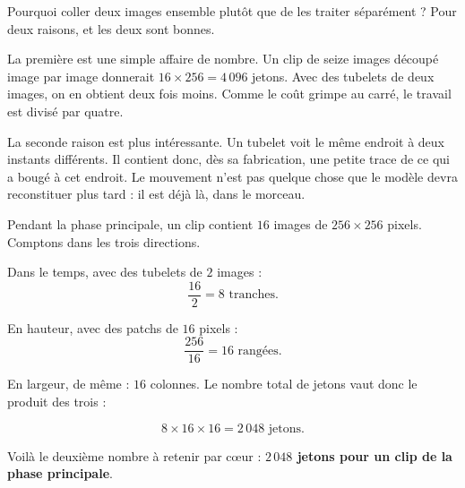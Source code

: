 Pourquoi coller deux images ensemble plutôt que de les traiter séparément ?
Pour deux raisons, et les deux sont bonnes.

La première est une simple affaire de nombre. Un clip de seize images
découpé image par image donnerait $16 \times 256 = 4\,096$ jetons. Avec des
tubelets de deux images, on en obtient deux fois moins. Comme le coût grimpe
au carré, le travail est divisé par quatre.

La seconde raison est plus intéressante. Un tubelet voit le même endroit à
deux instants différents. Il contient donc, dès sa fabrication, une petite
trace de ce qui a bougé à cet endroit. Le mouvement n'est pas quelque chose
que le modèle devra reconstituer plus tard : il est déjà là, dans le
morceau.

\begin{exemple}
Pendant la phase principale, un clip contient $16$ images de
$256 \times 256$ pixels. Comptons dans les trois directions.

Dans le temps, avec des tubelets de $2$ images :
\[ \frac{16}{2} = 8 \text{ tranches.} \]

En hauteur, avec des patchs de $16$ pixels :
\[ \frac{256}{16} = 16 \text{ rangées.} \]

En largeur, de même : $16$ colonnes. Le nombre total de jetons vaut donc le
produit des trois :

\[
  8 \times 16 \times 16 = 2\,048 \text{ jetons.}
\]

Voilà le deuxième nombre à retenir par cœur : \textbf{$2\,048$ jetons pour
un clip de la phase principale}.
\end{exemple}

